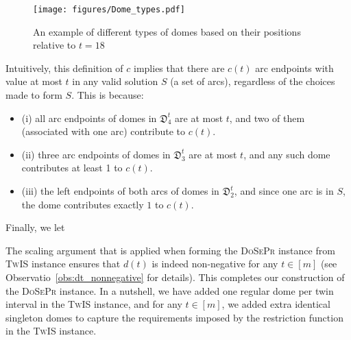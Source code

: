 \documentclass[letterpaper,11pt]{article}
\newcommand{\tis}{\textsc{TwIS}\xspace}
\newcommand{\dspr}{\textsc{DoSePr}\xspace}
\begin{document}
\begin{figure}
	\centering
	\texttt{[image: figures/Dome\_types.pdf]}
	\caption{An example of different types of domes based on their positions relative to $t=18$}
	\label{fig:dometypes}
\end{figure}

Intuitively, this definition of $c$ implies that there are $c(t)$ arc endpoints with value at most $t$ in any valid solution $S$ (a set of arcs), 
regardless of the choices made to form $S$. This is because:
\begin{itemize}
    \item (i) all arc endpoints of domes in $\mathfrak{D}^t_4$ are at most $t$, and two of them (associated with one arc) contribute to $c(t)$.
    \item (ii) three arc endpoints of domes in $\mathfrak{D}^t_3$ are at most $t$, and any such dome contributes at least 1 to $c(t)$. \item 
(iii) the left endpoints of both arcs of domes in $\mathfrak{D}^t_2$, and since one arc is in $S$, the dome contributes exactly $1$ to $c(t)$.  
\end{itemize}

Finally, we let 

The scaling argument that is applied when forming the \dspr instance from \tis instance ensures that $d(t)$ is indeed non-negative for any $t\in [m]$ (see Observatio~\ref{obs:dt_nonnegative} for details).
This completes our construction of the \dspr instance. In a nutshell, we have added one regular dome per twin interval in the \tis instance, and for any $t\in[m]$, we added extra identical singleton domes to capture the requirements imposed by the restriction function in the \tis instance. 
\end{document}
